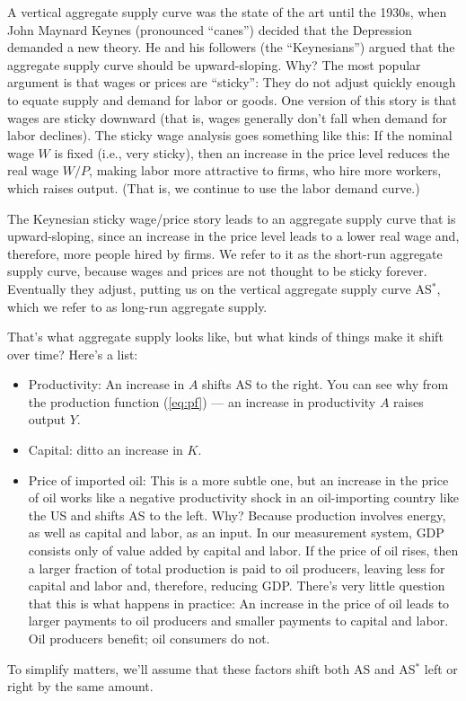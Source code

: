 
A vertical aggregate supply curve was the state of the art until the 1930s,
when John Maynard Keynes
(pronounced ``canes'')
decided that the Depression demanded a new theory.
He and his followers (the ``Keynesians'')
argued that the aggregate supply curve should be upward-sloping.
Why?  The most popular argument is that wages or prices are ``sticky'':
They do not adjust quickly enough
to equate supply and demand for labor or goods. One version of this story is that
wages are sticky downward (that is, wages generally don't fall when
demand for labor declines).
The sticky wage
 analysis goes something like this:
If the nominal wage $W$ is fixed (i.e., very sticky),
then an increase in the price level reduces the real wage $W/P$,
making labor more attractive to firms, who hire more workers,
which raises output.
(That is, we continue to use the labor demand curve.)

The Keynesian sticky wage/price story leads to
an aggregate supply curve that is upward-sloping,
since an increase in the price level leads to a lower
real wage and, therefore, more people hired by firms.
We refer to it as the short-run aggregate supply
 curve, because wages and prices are not thought to be sticky forever.
Eventually they adjust, putting us on the vertical aggregate
supply curve AS$^*$, which we refer to as long-run aggregate supply.


That's what aggregate supply looks like,
but what kinds of things make it shift over time?
Here's a list:
%
\begin{itemize}
\item Productivity:  An increase in $A$ shifts AS to the right.
You can see why from the production function (\ref{eq:pf}) --- an increase in productivity $A$ raises output $Y$.


\item Capital:  ditto an increase in $K$.
\item Price of imported oil:  This is a more subtle one, but
an increase in the price of oil works like a negative productivity shock
in an oil-importing country like the US and shifts AS to the left.
Why?  Because production involves energy, as well as capital and labor, as an input.
In our measurement system, GDP consists only of value added by capital
and labor.
If the price of oil rises, then a larger fraction of total production
is paid to oil producers, leaving less for capital and labor and, therefore, reducing GDP.
There's very little question that this is what happens in practice: An increase in the price of oil leads to larger payments to oil producers
and smaller payments to capital and labor.
Oil producers benefit; oil consumers do not.
\end{itemize}
%
To simplify matters, we'll assume that these factors shift both AS and AS$^*$
left or right by the same amount.


